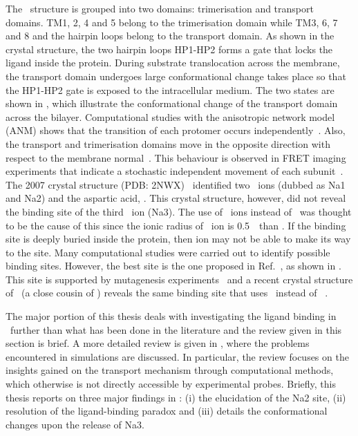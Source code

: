 The \GltPh\ structure is grouped into two domains: trimerisation and transport domains. TM1, 2, 4 
and 5 belong to the trimerisation domain while TM3, 6, 7 and 8 and the hairpin loops belong to the 
transport domain. As shown in the crystal structure, the two hairpin loops HP1-HP2 forms a gate 
that locks the ligand inside the protein. During substrate translocation across the membrane, the 
transport domain undergoes large conformational change takes place so that the HP1-HP2 gate is 
exposed to the intracellular medium. The two states are shown in , which 
illustrate the conformational change of the transport domain across the bilayer. Computational 
studies with the anisotropic network model (ANM) shows that the transition of each protomer occurs 
independently~\cite{Jiang2011,Bahar2010}. Also, the transport and trimerisation domains move in the 
opposite direction with respect to the membrane normal~\cite{Stolzenberg2012}. This behaviour is 
observed in FRET imaging experiments that indicate a stochastic independent movement of each 
subunit~\cite{Akyuz2013,Akyuz2015}. The 2007 crystal structure (PDB: 2NWX)~\cite{Boudker2007} 
identified two \Na\ ions (dubbed as Na1 and Na2) and the aspartic acid, . 
This crystal structure, however, did not reveal the binding site of the third \Na\ ion (Na3). 
The use of \Tl\ ions instead of \Na\ was thought to be the cause of this since the ionic radius 
of \Tl\ ion is 0.5~\angs\ than \Na. If the binding site is deeply buried inside the protein, then 
ion may not be able to make its way to the site. Many computational studies were carried out to 
identify possible binding sites. However, the best site is the one proposed in 
Ref.~\cite{Bastug2012}, as shown in . This site is supported by mutagenesis
experiments~\cite{Bastug2012} and a recent crystal structure of \GltTk\ (a close cousin of \GltPh) 
reveals the same binding site that uses \Na\ instead of \Tl~\cite{Guskov2016}.

The major portion of this thesis deals with investigating the ligand binding in \GltPh\ further 
than what has been done in the literature and the review given in this section is brief. A more 
detailed review is given in , where the problems encountered in simulations 
are discussed. In particular, the review focuses on the insights 
gained on the transport mechanism through computational methods, which otherwise is not directly 
accessible by experimental probes. Briefly, this thesis reports on three major findings in \GltPh: 
(i) the elucidation of the Na2 site, (ii) resolution of the ligand-binding paradox and (iii) 
details the conformational changes upon the release of Na3.


